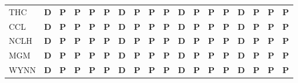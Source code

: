 \documentclass[11pt,a4paper]{article}
\begin{document}
\begin{center}
\begin{tabular}{@{}lccccccccccccccccc@{}}
THC & \textcolor{good}{\textbf{D}} & \textcolor{amber}{\textbf{P}} & \textcolor{amber}{\textbf{P}} & \textcolor{amber}{\textbf{P}} & \textcolor{amber}{\textbf{P}} & \textcolor{good}{\textbf{D}} & \textcolor{amber}{\textbf{P}} & \textcolor{amber}{\textbf{P}} & \textcolor{amber}{\textbf{P}} & \textcolor{good}{\textbf{D}} & \textcolor{amber}{\textbf{P}} & \textcolor{amber}{\textbf{P}} & \textcolor{amber}{\textbf{P}} & \textcolor{good}{\textbf{D}} & \textcolor{amber}{\textbf{P}} & \textcolor{amber}{\textbf{P}} & \textcolor{amber}{\textbf{P}} \\
CCL & \textcolor{good}{\textbf{D}} & \textcolor{amber}{\textbf{P}} & \textcolor{amber}{\textbf{P}} & \textcolor{amber}{\textbf{P}} & \textcolor{amber}{\textbf{P}} & \textcolor{good}{\textbf{D}} & \textcolor{amber}{\textbf{P}} & \textcolor{amber}{\textbf{P}} & \textcolor{amber}{\textbf{P}} & \textcolor{good}{\textbf{D}} & \textcolor{amber}{\textbf{P}} & \textcolor{amber}{\textbf{P}} & \textcolor{amber}{\textbf{P}} & \textcolor{good}{\textbf{D}} & \textcolor{amber}{\textbf{P}} & \textcolor{amber}{\textbf{P}} & \textcolor{amber}{\textbf{P}} \\
NCLH & \textcolor{good}{\textbf{D}} & \textcolor{amber}{\textbf{P}} & \textcolor{amber}{\textbf{P}} & \textcolor{amber}{\textbf{P}} & \textcolor{amber}{\textbf{P}} & \textcolor{good}{\textbf{D}} & \textcolor{amber}{\textbf{P}} & \textcolor{amber}{\textbf{P}} & \textcolor{amber}{\textbf{P}} & \textcolor{good}{\textbf{D}} & \textcolor{amber}{\textbf{P}} & \textcolor{amber}{\textbf{P}} & \textcolor{amber}{\textbf{P}} & \textcolor{good}{\textbf{D}} & \textcolor{amber}{\textbf{P}} & \textcolor{amber}{\textbf{P}} & \textcolor{amber}{\textbf{P}} \\
MGM & \textcolor{good}{\textbf{D}} & \textcolor{amber}{\textbf{P}} & \textcolor{amber}{\textbf{P}} & \textcolor{amber}{\textbf{P}} & \textcolor{amber}{\textbf{P}} & \textcolor{good}{\textbf{D}} & \textcolor{amber}{\textbf{P}} & \textcolor{amber}{\textbf{P}} & \textcolor{amber}{\textbf{P}} & \textcolor{good}{\textbf{D}} & \textcolor{amber}{\textbf{P}} & \textcolor{amber}{\textbf{P}} & \textcolor{amber}{\textbf{P}} & \textcolor{good}{\textbf{D}} & \textcolor{amber}{\textbf{P}} & \textcolor{amber}{\textbf{P}} & \textcolor{amber}{\textbf{P}} \\
WYNN & \textcolor{good}{\textbf{D}} & \textcolor{amber}{\textbf{P}} & \textcolor{amber}{\textbf{P}} & \textcolor{amber}{\textbf{P}} & \textcolor{amber}{\textbf{P}} & \textcolor{good}{\textbf{D}} & \textcolor{amber}{\textbf{P}} & \textcolor{amber}{\textbf{P}} & \textcolor{amber}{\textbf{P}} & \textcolor{good}{\textbf{D}} & \textcolor{amber}{\textbf{P}} & \textcolor{amber}{\textbf{P}} & \textcolor{amber}{\textbf{P}} & \textcolor{good}{\textbf{D}} & \textcolor{amber}{\textbf{P}} & \textcolor{amber}{\textbf{P}} & \textcolor{amber}{\textbf{P}} \\
\bottomrule\end{tabular}\end{center}
\end{document}
